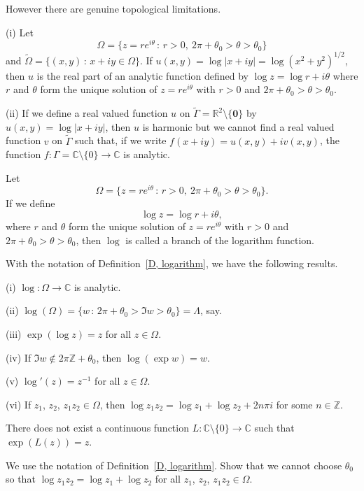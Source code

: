 However there are genuine topological limitations.
\begin{example} 
(i) Let
\[\Omega=\{z=re^{i\theta}\,:\,r>0,
\ 2\pi+\theta_{0}>\theta>\theta_{0}\}\]
and $\tilde{\Omega}=\{(x,y)\,:\,x+iy\in\Omega\}$. If
$u(x,y)=\log |x+iy|=\log (x^{2}+y^{2})^{1/2}$, then $u$
is the real part of an analytic function
defined by $\log z=\log r+i\theta$
where $r$ and $\theta$ form the unique solution
of $z=re^{i \theta}$ with $r>0$ and 
$2\pi+\theta_{0}>\theta>\theta_{0}$.

(ii) If we define a real valued function $u$ on 
$\tilde{\Gamma}={\mathbb R}^{2}\setminus\{{\boldsymbol 0}\}$
by $u(x,y)=\log |x+iy|$,
then $u$ is harmonic but we cannot find a real valued function $v$
on $\tilde{\Gamma}$ such that,
if we write $f(x+iy)=u(x,y)+iv(x,y)$, the
function $f:\Gamma={\mathbb C}\setminus\{0\}
\rightarrow{\mathbb C}$ is analytic.
\end{example}
\begin{definition}\label{D, logarithm} 
Let
\[\Omega=\{z=re^{i\theta}\,:\,r>0,
\ 2\pi+\theta_{0}>\theta>\theta_{0}\}.\]
If we define
\[\log z=\log r+i\theta,\]
where $r$ and $\theta$ form the unique solution
of $z=re^{i \theta}$ with $r>0$ and 
$2\pi+\theta_{0}>\theta>\theta_{0}$,
then $\log$ is called a branch of the logarithm function.
\end{definition}
\begin{lemma}\label{L, properties logarithm}
With the notation of Definition~\ref{D, logarithm},
we have the following results.

(i) $\log:\Omega\rightarrow{\mathbb C}$ is analytic.

(ii) $\log(\Omega)=\{w\,:\, 2\pi+\theta_{0}>\Im w>\theta_{0}\}
=\Lambda$, say.

(iii) $\exp(\log z)=z$ for all $z\in\Omega$.

(iv) If $\Im w\notin 2\pi{\mathbb Z}+\theta_{0}$, then
$\log(\exp w)=w$.

(v) $\log'(z)=z^{-1}$ for all $z\in\Omega$.

(vi) If $z_{1}$, $z_{2}$, $z_{1}z_{2}\in\Omega$,
then $\log z_{1}z_{2}=\log z_{1}+\log z_{2}+2n\pi i$ for
some $n\in{\mathbb Z}$.
\end{lemma} 
\begin{lemma} There does not exist a continuous
function $L:{\mathbb C}\setminus\{0\}\rightarrow{\mathbb C}$
such that $\exp(L(z))=z$.
\end{lemma} 
\begin{exercise}\label{Exercise, logarithm 1}
We use the notation of
Definition~\ref{D, logarithm}. Show that we cannot choose
$\theta_{0}$ so that $\log z_{1}z_{2}=\log z_{1}+\log z_{2}$
for all $z_{1}$, $z_{2}$, $z_{1}z_{2}\in\Omega$.
\end{exercise}  

